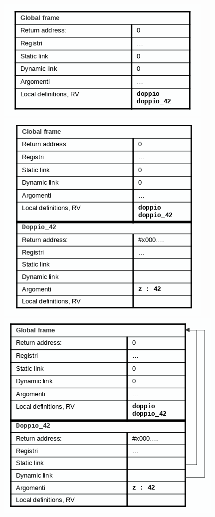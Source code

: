 \documentclass[a4paper,12pt, oneside]{book}
\begin{document}
\begin{center}
\includegraphics[scale=0.4]{img/sta1.png}
\quad 
\includegraphics[scale=0.4]{img/sta2.png}
\quad
\includegraphics[scale=0.4]{img/sta3.png}
\end{center}
\end{document}
